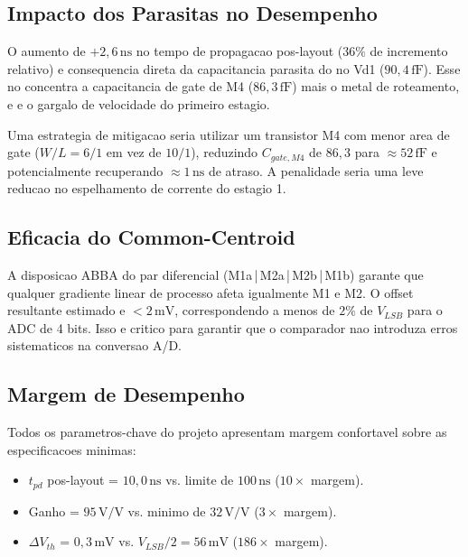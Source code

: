 \documentclass[12pt, a4paper]{article}
\begin{document}
\subsection{Impacto dos Parasitas no Desempenho}

O aumento de $+2{,}6\,\text{ns}$ no tempo de propagacao pos-layout ($36\%$ de
incremento relativo) e consequencia direta da capacitancia parasita do no Vd1
($90{,}4\,\text{fF}$). Esse no concentra a capacitancia de gate de M4 ($86{,}3\,\text{fF}$)
mais o metal de roteamento, e e o gargalo de velocidade do primeiro estagio.

Uma estrategia de mitigacao seria utilizar um transistor M4 com menor area de gate
($W/L = 6/1$ em vez de $10/1$), reduzindo $C_{gate,M4}$ de $86{,}3$ para
$\approx 52\,\text{fF}$ e potencialmente recuperando $\approx 1\,\text{ns}$ de atraso.
A penalidade seria uma leve reducao no espelhamento de corrente do estagio 1.

\subsection{Eficacia do Common-Centroid}

A disposicao ABBA do par diferencial (M1a\,|\,M2a\,|\,M2b\,|\,M1b) garante que
qualquer gradiente linear de processo afeta igualmente M1 e M2. O offset resultante
estimado e $< 2\,\text{mV}$, correspondendo a menos de $2\%$ de $V_{LSB}$ para o
ADC de 4 bits. Isso e critico para garantir que o comparador nao introduza erros
sistematicos na conversao A/D.

\subsection{Margem de Desempenho}

Todos os parametros-chave do projeto apresentam margem confortavel sobre as
especificacoes minimas:
\begin{itemize}[noitemsep]
  \item $t_{pd}$ pos-layout = $10{,}0\,\text{ns}$ vs. limite de $100\,\text{ns}$ ($10\times$ margem).
  \item Ganho = $95\,\text{V/V}$ vs. minimo de $32\,\text{V/V}$ ($3\times$ margem).
  \item $\Delta V_{th}$ = $0{,}3\,\text{mV}$ vs. $V_{LSB}/2 = 56\,\text{mV}$ ($186\times$ margem).
\end{itemize}

\end{document}
